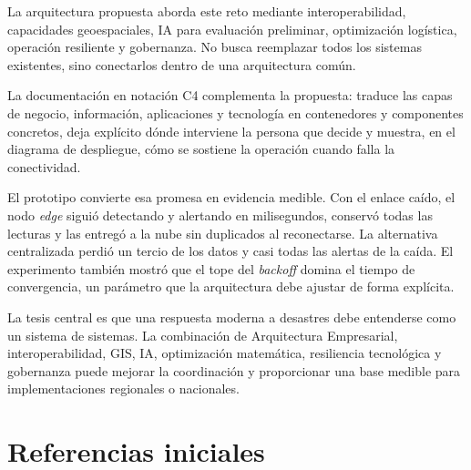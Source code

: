\documentclass[11pt,a4paper]{article}
\begin{document}
La arquitectura propuesta aborda este reto mediante interoperabilidad,
capacidades geoespaciales, IA para evaluación preliminar, optimización
logística, operación resiliente y gobernanza. No busca reemplazar todos los
sistemas existentes, sino conectarlos dentro de una arquitectura común.

La documentación en notación C4 complementa la propuesta: traduce las capas de
negocio, información, aplicaciones y tecnología en contenedores y componentes
concretos, deja explícito dónde interviene la persona que decide y muestra, en
el diagrama de despliegue, cómo se sostiene la operación cuando falla la
conectividad.

El prototipo convierte esa promesa en evidencia medible. Con el enlace caído,
el nodo \emph{edge} siguió detectando y alertando en milisegundos, conservó
todas las lecturas y las entregó a la nube sin duplicados al reconectarse. La
alternativa centralizada perdió un tercio de los datos y casi todas las
alertas de la caída. El experimento también mostró que el tope del
\emph{backoff} domina el tiempo de convergencia, un parámetro que la
arquitectura debe ajustar de forma explícita.

La tesis central es que una respuesta moderna a desastres debe entenderse como
un sistema de sistemas. La combinación de Arquitectura Empresarial,
interoperabilidad, GIS, IA, optimización matemática, resiliencia tecnológica y
gobernanza puede mejorar la coordinación y proporcionar una base medible para
implementaciones regionales o nacionales.

\section*{Referencias iniciales}
\end{document}
